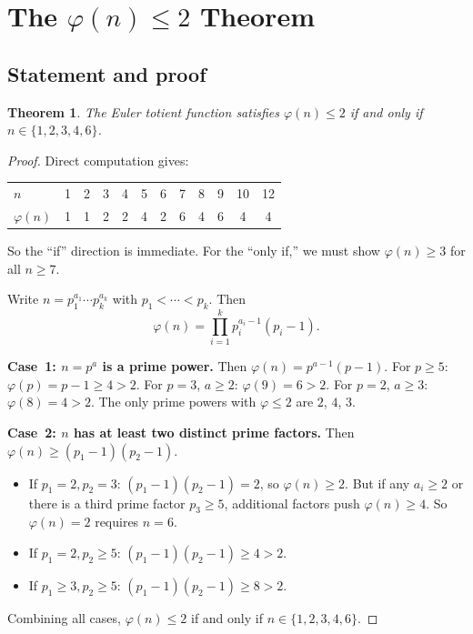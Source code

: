 \documentclass[preprint]{revtex4-2}
\newtheorem{theorem}{Theorem}
\begin{document}
\section{The $\varphi(n) \leq 2$ Theorem}\label{sec:theorem}

\subsection{Statement and proof}

\begin{theorem}\label{thm:totient}
The Euler totient function satisfies $\varphi(n) \leq 2$ if and only if $n \in \{1, 2, 3, 4, 6\}$.
\end{theorem}

\begin{proof}
Direct computation gives:

\begin{center}
\begin{tabular}{l*{11}{c}}
\toprule
$n$ & 1 & 2 & 3 & 4 & 5 & 6 & 7 & 8 & 9 & 10 & 12 \\
$\varphi(n)$ & 1 & 1 & 2 & 2 & 4 & 2 & 6 & 4 & 6 & 4 & 4 \\
\bottomrule
\end{tabular}
\end{center}

So the ``if'' direction is immediate. For the ``only if,'' we must show $\varphi(n) \geq 3$ for all $n \geq 7$.

Write $n = p_1^{a_1} \cdots p_k^{a_k}$ with $p_1 < \cdots < p_k$. Then
\begin{equation}
\varphi(n) = \prod_{i=1}^{k} p_i^{a_i - 1}(p_i - 1).
\end{equation}

\textbf{Case~1: $n = p^a$ is a prime power.}
Then $\varphi(n) = p^{a-1}(p-1)$. For $p \geq 5$: $\varphi(p) = p - 1 \geq 4 > 2$. For $p = 3$, $a \geq 2$: $\varphi(9) = 6 > 2$. For $p = 2$, $a \geq 3$: $\varphi(8) = 4 > 2$. The only prime powers with $\varphi \leq 2$ are $2$, $4$, $3$.

\textbf{Case~2: $n$ has at least two distinct prime factors.}
Then $\varphi(n) \geq (p_1 - 1)(p_2 - 1)$.
\begin{itemize}
\item If $p_1 = 2, p_2 = 3$: $(p_1 - 1)(p_2 - 1) = 2$, so $\varphi(n) \geq 2$. But if any $a_i \geq 2$ or there is a third prime factor $p_3 \geq 5$, additional factors push $\varphi(n) \geq 4$. So $\varphi(n) = 2$ requires $n = 6$.
\item If $p_1 = 2, p_2 \geq 5$: $(p_1 - 1)(p_2 - 1) \geq 4 > 2$.
\item If $p_1 \geq 3, p_2 \geq 5$: $(p_1 - 1)(p_2 - 1) \geq 8 > 2$.
\end{itemize}

Combining all cases, $\varphi(n) \leq 2$ if and only if $n \in \{1, 2, 3, 4, 6\}$.
\end{proof}
\end{document}

